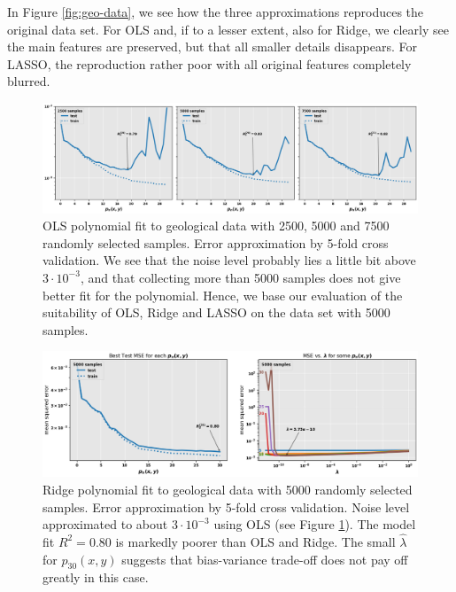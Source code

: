 \documentclass[]{article}
\begin{document}
In Figure \ref{fig:geo-data}, we see how the three approximations reproduces the original data set. For OLS and, if to a lesser extent, also for Ridge, we clearly see the main features are preserved, but that all smaller details disappears. For LASSO, the reproduction rather poor with all original features completely blurred.


\begin{figure}[!htb]
	\centering
	\includegraphics[width=1\linewidth]{./results/geo-ols-cv.png}
	\caption{OLS polynomial fit to geological data with 2500, 5000 and 7500 randomly selected samples. Error approximation by 5-fold cross validation. We see that the noise level probably lies a little bit above $3 \cdot 10^{-3}$, and that collecting more than 5000 samples does not give better fit for the polynomial. Hence, we base our evaluation of the suitability of OLS, Ridge and LASSO on the data set with 5000 samples.}
	\label{fig:geo-ols-cv}
\end{figure}

\begin{figure}[!htb]
	\centering
	\includegraphics[width=1\linewidth]{./results/geo-ridge-cv.png}
	\caption{Ridge polynomial fit to geological data with 5000 randomly selected samples. Error approximation by 5-fold cross validation. Noise level approximated to about $3 \cdot 10^{-3}$ using OLS (see Figure \ref{fig:geo-ols-cv}). The model fit $R^2 = 0.80$ is markedly poorer than OLS and Ridge. The small $\hat{\lambda}$ for $p_{30}(x,y)$ suggests that bias-variance trade-off does not pay off greatly in this case.}
	\label{fig:geo-ridge-cv}
\end{figure}
\end{document}
